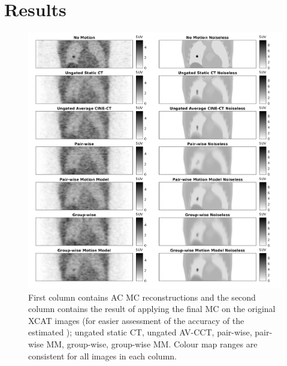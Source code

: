 \section{Results} \label{sec:results}
    \begin{figure}
        
        \centering
        
        \includegraphics[width=1.0\linewidth]{figures/visual_analysis.png}
        
        
        \captionsetup{singlelinecheck=false, justification=centering}
        \caption{First column contains \gls{AC} \gls{MC} reconstructions and the second column contains the result of applying the final  \gls{MC} on the original XCAT images (for easier assessment of the accuracy of the estimated ); ungated static \gls{CT}, ungated \gls{AV-CCT}, pair-wise, pair-wise \gls{MM}, group-wise, group-wise \gls{MM}. Colour map ranges are consistent for all images in each column.}
        
        \label{fig:visual_analysis}
        
    \end{figure}
    
